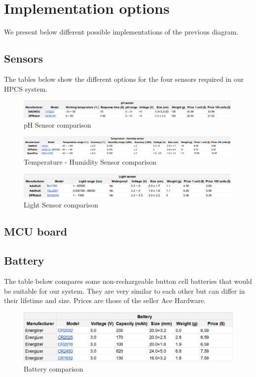 \section{Implementation options}
We present below different possible implementations of the previous diagram.

\subsection{Sensors}
The tables below show the different options for the four sensors required in our HPCS system.

\begin{figure}[h]
    \includegraphics[width=\linewidth]{images/ph-sensor-comparison.png}
    \caption{pH Sensor comparison}
    \label{fig:pH Sensor Comparison}
\end{figure}

\begin{figure}[h]
    \includegraphics[width=\linewidth]{images/temp-hum-sensor-comparison.png}
    \caption{Temperature - Humidity Sensor comparison}
    \label{fig:Temperature - Humidity Sensor Comparison}
\end{figure}

\begin{figure}[h]
    \includegraphics[width=\linewidth]{images/light-sensor-comparison.png}
    \caption{Light Sensor comparison}
    \label{fig:Light Sensor Comparison}
\end{figure}
\subsection{MCU board}
\subsection{Battery}
The table below compares some non-rechargeable button cell batteries that would be suitable for our system.
They are very similar to each other but can differ in their lifetime and size. Prices are those of the seller Ace Hardware.
\begin{figure}[h]
    \includegraphics[width=\linewidth]{images/battery-comparison.jpg}
    \caption{Battery comparison}
    \label{fig:Battery Comparison}
\end{figure}

